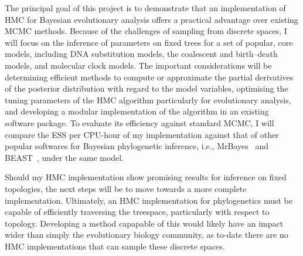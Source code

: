 \documentclass{article}
\begin{document}
    The principal goal of this project is to demonstrate that an implementation
        of \ac{HMC} for Bayesian evolutionary analysis offers a practical
        advantage over existing \ac{MCMC} methods.
    Because of the challenges of sampling from discrete spaces, I will focus on
        the inference of parameters on fixed trees for a set of popular, core
        models, including DNA substitution models, the coalescent and
        birth--death models, and molecular clock models.
    The important considerations will be determining efficient methods to
        compute or approximate the partial derivatives of the posterior
        distribution with regard to the model variables, optimising the tuning
        parameters of the \ac{HMC} algorithm particularly for evolutionary
        analysis, and developing a modular implementation of the algorithm in
        an existing software package.
    To evaluate its efficiency against standard \ac{MCMC}, I will compare the
        \ac{ESS} per CPU-hour of my implementation against that of other
        popular softwares for Bayesian phylogenetic inference, i.e.,
        MrBayes~\cite{RH03} and BEAST~\cite{Dru+12,Bou+14}, under the same
        model.

    Should my \ac{HMC} implementation show promising results for inference on
        fixed topologies, the next steps will be to move towards a more
        complete implementation.
    Ultimately, an \ac{HMC} implementation for phylogenetics must be capable of
        efficiently traversing the treespace, particularly with respect to
        topology.
    Developing a method capapable of this would likely have an impact wider
        than simply the evolutionary biology community, as to-date there are no
        \ac{HMC} implementations that can sample these discrete spaces.

    \printbibliography
\end{document}
